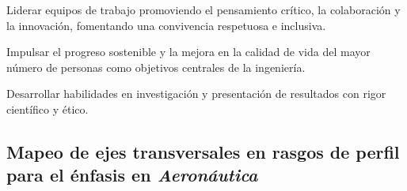 \begin{cuadroazul}[LID01]
Liderar equipos de trabajo promoviendo el pensamiento crítico, la colaboración y la innovación, fomentando una convivencia respetuosa e inclusiva.
\end{cuadroazul}

\begin{cuadroazul}[SYC01]
Impulsar el progreso sostenible y la mejora en la calidad de vida del mayor número de personas como objetivos centrales de la ingeniería.
\end{cuadroazul}

\begin{cuadroazul}[IPR01]
Desarrollar habilidades en investigación y presentación de resultados con rigor científico y ético.
\end{cuadroazul}

\subsection*{Mapeo de ejes transversales en rasgos de perfil para el énfasis en \textit{Aeronáutica}}

